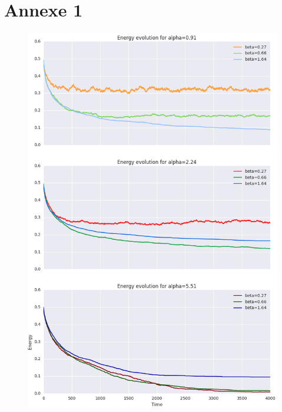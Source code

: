 \documentclass[twocolumn]{article}
\begin{document}
\section{Annexe 1}
\begin{figure}[!h]
	\includegraphics[width=\columnwidth]{../tobekept/ex1_4826864907612068410-r.png}
\end{figure}
\end{document}
